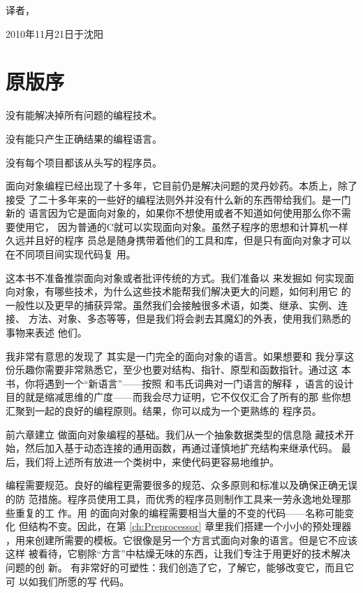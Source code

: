 \bigskip
\bigskip

\begin{flushright}
	译者，

	2010年11月21日于沈阳
\end{flushright}


\chapter{原版序}
\label{ch:OrigPreface}

\begin{flushright}
    没有能解决掉所有问题的编程技术。

    没有能只产生正确结果的编程语言。

    没有每个项目都该从头写的程序员。

\end{flushright}

面向对象编程已经出现了十多年，它目前仍是解决问题的灵丹妙药。本质上，除了接受
了二十多年来的一些好的编程法则外并没有什么新的东西带给我们。\cpp 是一门新的
语言因为它是面向对象的，如果你不想使用或者不知道如何使用那么你不需要使用它，
因为普通的C就可以实现面向对象。虽然子程序的思想和计算机一样久远并且好的程序
员总是随身携带着他们的工具和库，但是只有面向对象才可以在不同项目间实现代码复
用。

这本书不准备推崇面向对象或者批评传统的方式。我们准备以 来发掘如
何实现面向对象，有哪些技术，为什么这些技术能帮我们解决更大的问题，如何利用它
的一般性以及更早的捕获异常。虽然我们会接触很多术语，如类、继承、实例、连接、
方法、对象、多态等等，但是我们将会剥去其魔幻的外表，使用我们熟悉的事物来表述
他们。

我非常有意思的发现了 其实是一门完全的面向对象的语言。如果想要和
我分享这份乐趣你需要非常熟悉它，至少也要对结构、指针、原型和函数指针。通过这
本书，你将遇到一个“新语言”——按照 和韦氏词典对一门语言的解释
，语言的设计目的就是缩减思维的广度——而我会尽力证明，它不仅仅汇合了所有的那
些你想汇聚到一起的良好的编程原则。结果，你可以成为一个更熟练的
程序员。

前六章建立 做面向对象编程的基础。我们从一个抽象数据类型的信息隐
藏技术开始，然后加入基于动态连接的通用函数，再通过谨慎地扩充结构来继承代码。
最后，我们将上述所有放进一个类树中，来使代码更容易地维护。

编程需要规范。良好的编程更需要很多的规范、众多原则和标准以及确保正确无误的防
范措施。程序员使用工具，而优秀的程序员则制作工具来一劳永逸地处理那些重复的工
作。用 的面向对象的编程需要相当大量的不变的代码——名称可能变化
但结构不变。因此，在第 \ref{ch:Preprocessor} 章里我们搭建一个小小的预处理器
，用来创建所需要的模板。它很像是另一个方言式面向对象的语言。但是它不应该这样
被看待，它剔除“方言”中枯燥无味的东西，让我们专注于用更好的技术解决问题的创
新。 有非常好的可塑性：我们创造了它，了解它，能够改变它，而且它可
以如我们所愿的写  代码。

